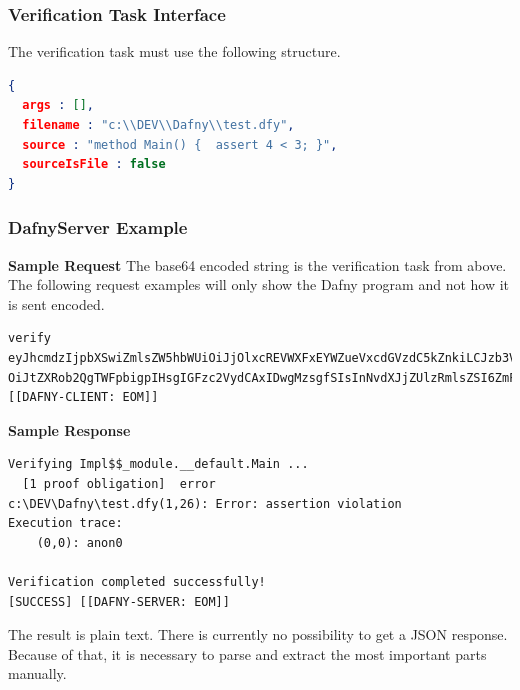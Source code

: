 \subsubsection{Verification Task Interface}\label{verificationtaskinterface}
The verification task must use the following structure. \newline
\begin{lstlisting}[language=json,firstnumber=1]
{
  args : [],
  filename : "c:\\DEV\\Dafny\\test.dfy",
  source : "method Main() {  assert 4 < 3; }",
  sourceIsFile : false
}
\end{lstlisting}
\subsubsection{DafnyServer Example}
\textbf{Sample Request}
The base64 encoded string is the verification task from above. 
The following request examples will only show the Dafny program and not how it is sent encoded. 
\begin{lstlisting}[language={},backgroundcolor=\color{background},basicstyle=\scriptsize\ttfamily]
verify
eyJhcmdzIjpbXSwiZmlsZW5hbWUiOiJjOlxcREVWXFxEYWZueVxcdGVzdC5kZnkiLCJzb3VyY2Ui
OiJtZXRob2QgTWFpbigpIHsgIGFzc2VydCAxIDwgMzsgfSIsInNvdXJjZUlzRmlsZSI6ZmFsc2V9
[[DAFNY-CLIENT: EOM]]
\end{lstlisting}
\textbf{Sample Response}
\begin{lstlisting}[language={},backgroundcolor=\color{background},basicstyle=\scriptsize\ttfamily]
Verifying Impl$$_module.__default.Main ...
  [1 proof obligation]  error
c:\DEV\Dafny\test.dfy(1,26): Error: assertion violation
Execution trace:
    (0,0): anon0

Verification completed successfully!
[SUCCESS] [[DAFNY-SERVER: EOM]]
\end{lstlisting}
The result is plain text. There is currently no possibility to get a JSON response. Because of that, it is necessary to parse and extract the most important parts manually. 
